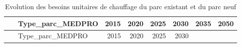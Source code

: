 \documentclass[]{article}
\begin{document}
\begin{longtable}[]{@{}clrrrrrr@{}}
\caption{Evolution des besoins unitaires de chauffage du parc existant
et du parc neuf}\tabularnewline
\toprule
\begin{minipage}[b]{0.17\columnwidth}\centering\strut
~\strut
\end{minipage} & \begin{minipage}[b]{0.19\columnwidth}\raggedright\strut
Type\_parc\_MEDPRO\strut
\end{minipage} & \begin{minipage}[b]{0.07\columnwidth}\raggedleft\strut
2015\strut
\end{minipage} & \begin{minipage}[b]{0.07\columnwidth}\raggedleft\strut
2020\strut
\end{minipage} & \begin{minipage}[b]{0.07\columnwidth}\raggedleft\strut
2025\strut
\end{minipage} & \begin{minipage}[b]{0.07\columnwidth}\raggedleft\strut
2030\strut
\end{minipage} & \begin{minipage}[b]{0.07\columnwidth}\raggedleft\strut
2035\strut
\end{minipage} & \begin{minipage}[b]{0.07\columnwidth}\raggedleft\strut
2050\strut
\end{minipage}\tabularnewline
\midrule
\endfirsthead
\toprule
\begin{minipage}[b]{0.17\columnwidth}\centering\strut
~\strut
\end{minipage} & \begin{minipage}[b]{0.19\columnwidth}\raggedright\strut
Type\_parc\_MEDPRO\strut
\end{minipage} & \begin{minipage}[b]{0.07\columnwidth}\raggedleft\strut
2015\strut
\end{minipage} & \begin{minipage}[b]{0.07\columnwidth}\raggedleft\strut
2020\strut
\end{minipage} & \begin{minipage}[b]{0.07\columnwidth}\raggedleft\strut
2025\strut
\end{minipage} & \begin{minipage}[b]{0.07\columnwidth}\raggedleft\strut
2030\strut
\end{minipage} & \begin{minipage}[b]{0.07\columnwidth}\raggedleft\strut

\end{minipage}
\end{longtable}
\end{document}
